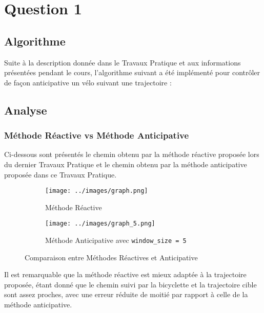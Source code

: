 \documentclass[../CSC_5RO16_TA_TP4.tex]{subfiles}
\begin{document}
\section{Question 1}

\subsection{Algorithme}
\noindent Suite à la description donnée dans le Travaux Pratique et aux informations présentées pendant le cours, l'algorithme suivant a été implémenté pour contrôler de façon anticipative un vélo suivant une trajectoire :\\

\begin{scriptsize}\mycode
    
\end{scriptsize}

\newpage\subsection{Analyse}

\subsubsection{Méthode Réactive vs Méthode Anticipative}
\noindent Ci-dessous sont présentés le chemin obtenu par la méthode réactive proposée lors du dernier Travaux Pratique et le chemin obtenu par la méthode anticipative proposée dans ce Travaux Pratique.
\begin{figure}[H]
    \centering
    \begin{subfigure}[b]{0.475\textwidth}
        \centering
        \texttt{[image: ../images/graph.png]}
        \caption{Méthode Réactive}
        \label{fig:methode_reative_grand}
    \end{subfigure}\hfill
    \begin{subfigure}[b]{0.475\textwidth}
        \centering
        \texttt{[image: ../images/graph\_5.png]}
        \caption{Méthode Anticipative avec \texttt{window\_size = 5}}
        \label{fig:methode_anticipative_5_grand}
    \end{subfigure}
    \caption{Comparaison entre Méthodes Réactives et Anticipative}
    \label{fig:methode_comparaison}
\end{figure}
\noindent Il est remarquable que la méthode réactive est mieux adaptée à la trajectoire proposée, étant donné que le chemin suivi par la bicyclette et la trajectoire cible sont assez proches, avec une erreur réduite de moitié par rapport à celle de la méthode anticipative.\\
\end{document}
